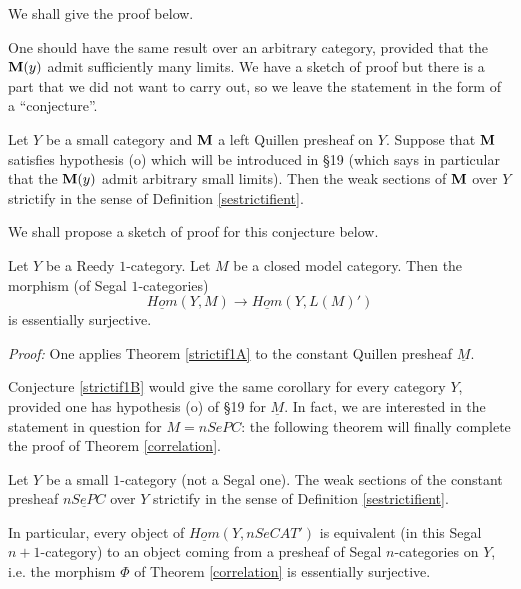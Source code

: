 We shall give the proof below.

One should have the same result over an arbitrary category, provided
that the ${\bf M} (y)$ admit sufficiently many limits. We have a
sketch of proof but there is a part that we did not want to carry out, so we
leave the statement in the form of a ``conjecture''.

\begin{conjecture}
\label{strictif1B}
Let $Y$ be a small category and ${\bf M}$ a left Quillen presheaf
on $Y$. Suppose that ${\bf M}$ satisfies hypothesis (o) which will be introduced
in \S 19 (which says in particular that the ${\bf M} (y)$ admit arbitrary small
limits). Then the weak sections of ${\bf M}$
over $Y$ strictify in the sense of Definition \ref{sestrictifient}.
\end{conjecture}

We shall propose a sketch of proof for this conjecture below.


\begin{corollary}
\label{strictif2A}
Let $Y$ be a Reedy $1$-category.
Let $M$ be a closed model category.
Then the morphism (of Segal $1$-categories)
$$
\underline{Hom} (Y,M)\rightarrow \underline{Hom}(Y,L(M)')
$$
is essentially surjective.
\end{corollary}
{\em Proof:} One applies Theorem \ref{strictif1A} to the constant Quillen
presheaf $\underline{M}$.
\eop

Conjecture \ref{strictif1B} would give the same corollary for every
category $Y$, provided one has hypothesis (o) of \S 19 for
$\underline{M}$.
In fact, we are interested in the statement in question for $M=nSePC$: the
following theorem will finally complete the proof of Theorem
\ref{correlation}.

\begin{theorem}
\label{strictif3}
Let $Y$ be a small $1$-category (not a Segal one). The weak sections of the
constant presheaf $\underline{nSePC}$ over $Y$ strictify
in the sense of Definition \ref{sestrictifient}.

In particular, every
object of $\underline{Hom}(Y, nSeCAT')$ is equivalent (in this
Segal $n+1$-category) to an object coming from a presheaf of
Segal $n$-categories on $Y$, i.e. the morphism $\Phi$ of Theorem
\ref{correlation} is essentially surjective.
\end{theorem}


